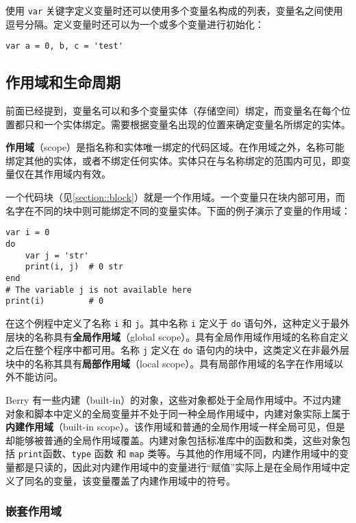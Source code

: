 使用 \texttt{var} 关键字定义变量时还可以使用多个变量名构成的列表，变量名之间使用逗号分隔。定义变量时还可以为一个或多个变量进行初始化：
\begin{lstlisting}[language=berry, numbers=none]
var a = 0, b, c = 'test'
\end{lstlisting}

\subsection{作用域和生命周期} \label{section::scope_life}

前面已经提到，变量名可以和多个变量实体（存储空间）绑定，而变量名在每个位置都只和一个实体绑定。需要根据变量名出现的位置来确定变量名所绑定的实体。

\textbf{作用域}（scope）是指名称和实体唯一绑定的代码区域。在作用域之外，名称可能绑定其他的实体，或者不绑定任何实体。实体只在与名称绑定的范围内可见，即变量仅在其作用域内有效。

一个代码块（见\ref{section::block}）就是一个作用域。一个变量只在块内部可用，而名字在不同的块中则可能绑定不同的变量实体。下面的例子演示了变量的作用域：
\begin{lstlisting}[language=berry]
var i = 0
do
    var j = 'str'
    print(i, j)  # 0 str
end
# The variable j is not available here
print(i)         # 0
\end{lstlisting}
在这个例程中定义了名称 \texttt{i} 和 \texttt{j}。其中名称 \texttt{i} 定义于 \texttt{do} 语句外，这种定义于最外层块的名称具有\textbf{全局作用域}（global scope）。具有全局作用域作用域的名称自定义之后在整个程序中都可用。名称 \texttt{j} 定义在 \texttt{do} 语句内的块中，这类定义在非最外层块中的名称其具有\textbf{局部作用域}（local scope）。具有局部作用域的名字在作用域以外不能访问。

Berry 有一些内建（built-in）的对象，这些对象都处于全局作用域中。不过内建对象和脚本中定义的全局变量并不处于同一种全局作用域中，内建对象实际上属于\textbf{内建作用域}（built-in scope）。该作用域和普通的全局作用域一样全局可见，但是却能够被普通的全局作用域覆盖。内建对象包括标准库中的函数和类，这些对象包括 \texttt{print}函数、\texttt{type} 函数 和 \texttt{map} 类等。与其他的作用域不同，内建作用域中的变量都是只读的，因此对内建作用域中的变量进行“赋值”实际上是在全局作用域中定义了同名的变量，该变量覆盖了内建作用域中的符号。

\subsubsection{嵌套作用域}

